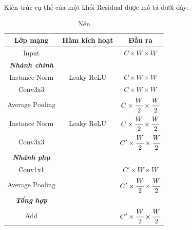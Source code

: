 \documentclass[12pt]{extreport}
\begin{document}
Kiến trúc cụ thể của một khối Residual được mô tả dưới đây:

\begin{table}[H]
    \centering
    \begin{subtable}[H]{.48\textwidth}
        \begin{adjustbox}{width=\textwidth}
            \begin{tabular}{c c c}
                Lớp mạng        & Hàm kích hoạt & Đầu ra                                          \\
                \hline
                Input           &               & $ C \times W \times W $                         \\
                \hline
                \textbf{\textit{Nhánh chính}}                                                     \\
                Instance Norm   & Leaky ReLU    & $ C \times W \times W $                         \\
                Conv3x3         &               & $ C \times W  \times W $                        \\
                Average Pooling &               & $ C \times \cfrac{W}{2}  \times \cfrac{W}{2} $  \\
                Instance Norm   & Leaky ReLU    & $ C \times \cfrac{W}{2}  \times \cfrac{W}{2} $  \\
                Conv3x3         &               & $ C' \times \cfrac{W}{2}  \times \cfrac{W}{2} $ \\
                \hline
                \textbf{\textit{Nhánh phụ}}                                                       \\
                Conv1x1         &               & $ C' \times W  \times W $                       \\
                Average Pooling &               & $ C' \times \cfrac{W}{2}  \times \cfrac{W}{2} $ \\
                \hline
                \textbf{\textit{Tổng hợp}}                                                        \\
                Add             &               & $ C' \times \cfrac{W}{2}  \times \cfrac{W}{2} $ \\
            \end{tabular}
        \end{adjustbox}
        \caption{Nén}
    \end{subtable}
    \begin{subtable}[H]{.48\textwidth}

\end{subtable}
\end{table}
\end{document}
